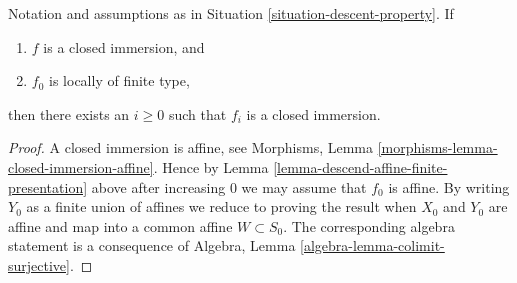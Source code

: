 \begin{lemma}
\label{lemma-descend-closed-immersion-finite-presentation}
Notation and assumptions as in Situation \ref{situation-descent-property}.
If
\begin{enumerate}
\item $f$ is a closed immersion, and
\item $f_0$ is locally of finite type,
\end{enumerate}
then there exists an $i \geq 0$ such that $f_i$ is a closed immersion.
\end{lemma}

\begin{proof}
A closed immersion is affine, see
Morphisms, Lemma \ref{morphisms-lemma-closed-immersion-affine}.
Hence by Lemma \ref{lemma-descend-affine-finite-presentation} above
after increasing $0$ we may assume that $f_0$ is affine.
By writing $Y_0$ as a finite union of affines we reduce to proving
the result when $X_0$ and $Y_0$ are affine and map
into a common affine $W \subset S_0$. The corresponding algebra
statement is a consequence of
Algebra, Lemma \ref{algebra-lemma-colimit-surjective}.
\end{proof}

